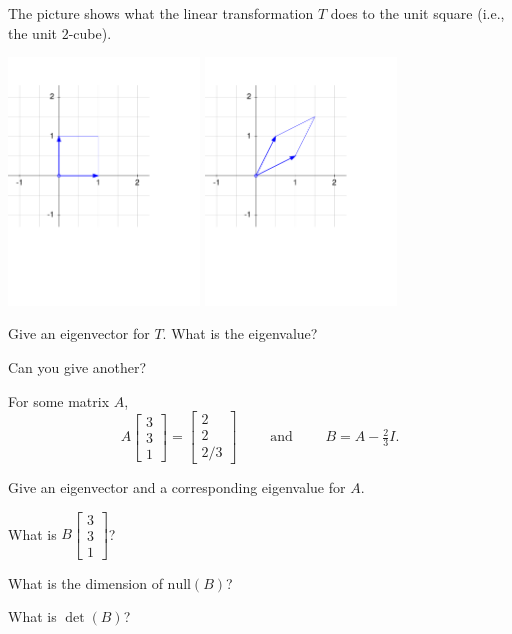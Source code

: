 \documentclass[14pt]{problemset}
\newcommand{\mat}[1]{\begin{bmatrix}#1\end{bmatrix}}
\begin{document}
	\question
	The picture shows what the linear transformation $T$ does to the unit square (i.e., the unit $2$-cube).
	
	\vspace{-1cm}
	\begin{center}
	\includegraphics[width=2in]{images/transform1b.pdf}
	\includegraphics[width=2in]{images/transform2b.pdf}
	\end{center}
	\vspace{-2.5cm}

	\begin{parts}
		\item Give an eigenvector for $T$.  What is the eigenvalue?
		\item Can you give another?
	\end{parts}


	\question
	For some matrix $A$,
	\vspace{-.2cm}
	\[
		A\mat{3\\3\\1}=\mat{2\\2\\2/3}\qquad\text{ and }\qquad B=A-\tfrac{2}{3}I.
	\]
	\vspace{-.4cm}
	\begin{parts}
		\item Give an eigenvector and a corresponding eigenvalue for $A$.
		\item What is $B\mat{3\\3\\1}$?
		\item What is the dimension of $\text{null}(B)$?
		\item What is $\det(B)$?
	\end{parts}
\end{document}
